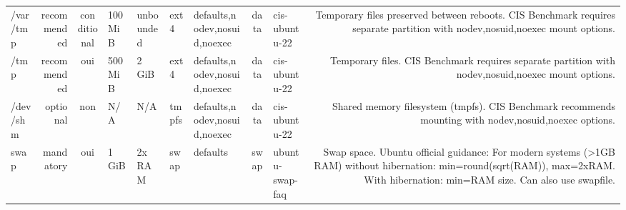 \documentclass[10pt,a4paper]{article}
\begin{document}
{\begin{longtable}{M R S Z Z T O C I N}
/var/tmp & \textcolor{cHigh}{recommended} & conditional & 100 MiB & unbounded & ext4 & defaults,nodev,nosuid,noexec & data & cis-ubuntu-22 & Temporary files preserved between reboots. CIS Benchmark requires separate partition with nodev,nosuid,noexec mount options.\\
/tmp & \textcolor{cHigh}{recommended} & \textcolor{cOk}{oui} & 500 MiB & 2 GiB & ext4 & defaults,nodev,nosuid,noexec & data & cis-ubuntu-22 & Temporary files. CIS Benchmark requires separate partition with nodev,nosuid,noexec mount options.\\
/dev/shm & \textcolor{cLow}{optional} & non & N/A & N/A & tmpfs & defaults,nodev,nosuid,noexec & data & cis-ubuntu-22 & Shared memory filesystem (tmpfs). CIS Benchmark recommends mounting with nodev,nosuid,noexec options.\\
swap & \textcolor{cBlock}{mandatory} & \textcolor{cOk}{oui} & 1 GiB & 2x RAM & swap & defaults & swap & ubuntu-swap-faq & Swap space. Ubuntu official guidance: For modern systems (>1GB RAM) without hibernation: min=round(sqrt(RAM)), max=2xRAM. With hibernation: min=RAM size. Can also use swapfile.\\
\bottomrule\end{longtable}}
\end{document}
